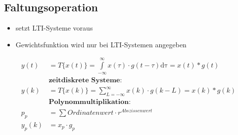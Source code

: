 \newpage
\subsection*{Faltungsoperation}
\begin{itemize}
  \item setzt LTI-Systeme voraus
  \item Gewichtsfunktion wird nur bei LTI-Systemen angegeben
\end{itemize}

\begin{align*}
	y\left( t \right) &= T \{ x\left(t\right) \}  = \int\limits_{-\infty}^{\infty}
	x\left(\tau\right) \cdot g\left(t-\tau\right) \mathrm{d\tau} = x\left(t\right) \ast g\left(t\right)
	\\
	&\textbf{zeitdiskrete Systeme:}
	\\
	y\left( k \right) &= T \{ x\left(k\right) \}  = \sum\limits_{L = -\infty}^{\infty}
	x\left(k\right) \cdot g\left(k-L\right) = x\left(k\right) \ast g\left(k\right)
	\\
	&\textbf{Polynommultiplikation:}
	\\
	p_p &= \sum Ordinatenwert \cdot r^{Abszissenwert}
	\\
	y_p \left(k\right) &= x_p \cdot g_p
\end{align*}